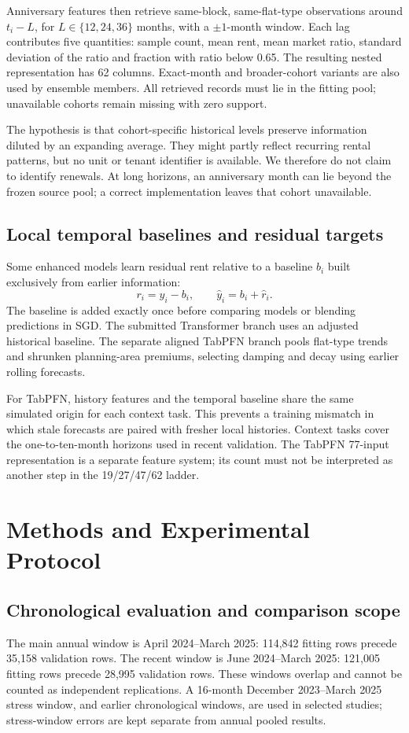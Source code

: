 \documentclass[conference]{IEEEtran}
\begin{document}
Anniversary features then retrieve same-block, same-flat-type observations around $t_i-L$, for $L\in\{12,24,36\}$ months, with a $\pm1$-month window. Each lag contributes five quantities: sample count, mean rent, mean market ratio, standard deviation of the ratio and fraction with ratio below 0.65. The resulting nested representation has 62 columns. Exact-month and broader-cohort variants are also used by ensemble members. All retrieved records must lie in the fitting pool; unavailable cohorts remain missing with zero support.

The hypothesis is that cohort-specific historical levels preserve information diluted by an expanding average. They might partly reflect recurring rental patterns, but no unit or tenant identifier is available. We therefore do not claim to identify renewals. At long horizons, an anniversary month can lie beyond the frozen source pool; a correct implementation leaves that cohort unavailable.

\subsection{Local temporal baselines and residual targets}
Some enhanced models learn residual rent relative to a baseline $b_i$ built exclusively from earlier information:
\begin{equation}
r_i=y_i-b_i,\qquad \widehat y_i=b_i+\widehat r_i.
\label{eq:residual}
\end{equation}
The baseline is added exactly once before comparing models or blending predictions in SGD. The submitted Transformer branch uses an adjusted historical baseline. The separate aligned TabPFN branch pools flat-type trends and shrunken planning-area premiums, selecting damping and decay using earlier rolling forecasts.

For TabPFN, history features and the temporal baseline share the same simulated origin for each context task. This prevents a training mismatch in which stale forecasts are paired with fresher local histories. Context tasks cover the one-to-ten-month horizons used in recent validation. The TabPFN 77-input representation is a separate feature system; its count must not be interpreted as another step in the 19/27/47/62 ladder.

\section{Methods and Experimental Protocol}
\subsection{Chronological evaluation and comparison scope}
The main annual window is April 2024--March 2025: 114,842 fitting rows precede 35,158 validation rows. The recent window is June 2024--March 2025: 121,005 fitting rows precede 28,995 validation rows. These windows overlap and cannot be counted as independent replications. A 16-month December 2023--March 2025 stress window, and earlier chronological windows, are used in selected studies; stress-window errors are kept separate from annual pooled results.
\end{document}
